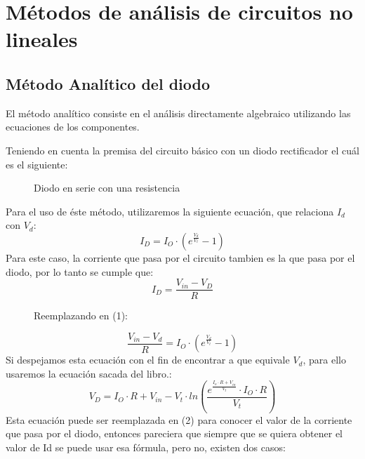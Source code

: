 \documentclass[11pt,fancy,lang=es]{elegantbook}
\begin{document}
\section{Métodos de análisis de circuitos no lineales}
\subsection{Método Analítico del diodo}
El método analítico consiste en el análisis directamente algebraico utilizando las ecuaciones de los componentes.



Teniendo en cuenta la premisa del circuito básico con un diodo rectificador el cuál es el siguiente:

\begin{figure}[h!]
    \centering
    \caption{Diodo en serie con una resistencia}
\end{figure}

Para el uso de éste método, utilizaremos la siguiente ecuación, que relaciona $I_{d}$ con $V_d$:
\begin{equation}
    I_D=I_O \cdot (e^\frac{V_d}{V_t}-1)
\end{equation}
Para este caso, la corriente que pasa por el circuito tambien es la que pasa por el diodo, por lo tanto se cumple que:
\begin{equation}
I_D=\frac{V_{in}-V_D}{R}
\end{equation}
\begin{figure}[h]
    \centering
   Reemplazando en (1):
\end{figure}

\begin{equation}
    \frac{V_{in}-V_d}{R}=I_O \cdot (e^\frac{V_d}{V_t}-1)
\end{equation}
Si despejamos esta ecuación con el fin de encontrar a que equivale $V_d$, para ello usaremos la ecuación sacada del libro.\cite{Libro_Unidad2}:
\begin{equation}
    V_D=I_O\cdot R + V_{in} - V_t \cdot ln(\frac{e^\frac{I_o\cdot R+V_{in}}{V_t}\cdot I_O \cdot R}{V_t})
\end{equation}
\newpage
Esta ecuación puede ser reemplazada en (2) para conocer el valor de la corriente que pasa por el diodo, entonces pareciera que siempre que se quiera obtener el valor de Id se puede usar esa fórmula, pero no, existen dos casos:
\end{document}
